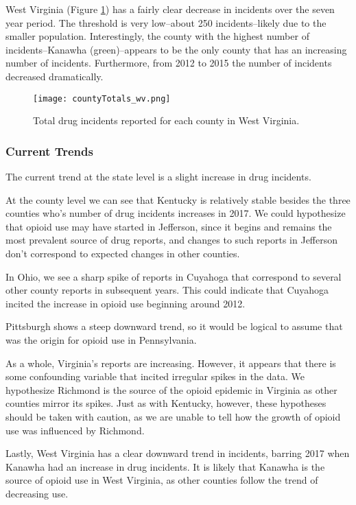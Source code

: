 \documentclass[12pt, letterpaper]{article}
\begin{document}
West Virginia (Figure \ref{fig:wv}) has a fairly clear decrease in incidents over the seven year period. The threshold is very low--about 250 incidents--likely due to the smaller population. Interestingly, the county with the highest number of incidents--Kanawha (green)--appears to be the only county that has an increasing number of incidents. Furthermore, from 2012 to 2015 the number of incidents decreased dramatically.

    \begin{figure}[H]
    \centering
    \texttt{[image: countyTotals\_wv.png]}
    \caption{Total drug incidents reported for each county in West Virginia.}
    \label{fig:wv}
    \end{figure}

\subsubsection{Current Trends}
The current trend at the state level is a slight increase in drug incidents. 

At the county level we can see that Kentucky is relatively stable besides the three counties who's number of drug incidents increases in 2017. We could hypothesize that opioid use may have started in Jefferson, since it begins and remains the most prevalent source of drug reports, and changes to such reports in Jefferson don't correspond to expected changes in other counties. 

In Ohio, we see a sharp spike of reports in Cuyahoga that correspond to several other county reports in subsequent years. This could indicate that Cuyahoga incited the increase in opioid use beginning around 2012. 

Pittsburgh shows a steep downward trend, so it would be logical to assume that was the origin for opioid use in Pennsylvania.

As a whole, Virginia's reports are increasing. However, it appears that there is some confounding variable that incited irregular spikes in the data. We hypothesize Richmond is the source of the opioid epidemic in Virginia as other counties mirror its spikes. Just as with Kentucky, however, these hypotheses should be taken with caution, as we are unable to tell how the growth of opioid use was influenced by Richmond. 

Lastly, West Virginia has a clear downward trend in incidents, barring 2017 when Kanawha had an increase in drug incidents. It is likely that Kanawha is the source of opioid use in West Virginia, as other counties follow the trend of decreasing use. 
\end{document}
